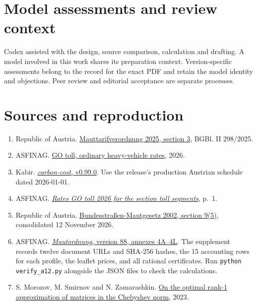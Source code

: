 \documentclass[11pt]{article}
\begin{document}
\section*{Model assessments and review context}
Codex assisted with the design, source comparison, calculation and drafting. A model involved in this work shares its preparation context. Version-specific assessments belong to the record for the exact PDF and retain the model identity and objections. Peer review and editorial acceptance are separate processes.

\section*{Sources and reproduction}
\begin{enumerate}
\item Republic of Austria. \href{https://ris.bka.gv.at/eli/bgbl/ii/2025/298/P3/NOR40273503}{Mauttarifverordnung 2025, section 3}, BGBl. II 298/2025.
\item ASFINAG. \href{https://go-maut.at/go-maut-bezahlen/tarife-go-maut/}{GO toll, ordinary heavy-vehicle rates}, 2026.
\item Kabir. \href{https://doi.org/10.5281/zenodo.24406888}{\textit{carbon-cost}, v0.99.0}. Use the release's production Austrian schedule dated 2026-01-01.
\item ASFINAG. \href{https://www.go-maut.at/media/zglel2dk/go-maut-tarife-2026_streckenmaut_en.pdf}{\textit{Rates GO toll 2026 for the section toll segments}}, p.~1.
\item Republic of Austria. \href{https://www.ris.bka.gv.at/GeltendeFassung.wxe?Abfrage=Bundesnormen&FassungVom=2026-11-12&Gesetzesnummer=20002090}{Bundesstra\ss en-Mautgesetz 2002, section 9(5)}, consolidated 12 November 2026.
\item ASFINAG. \href{https://www.asfinag.at/maut-vignette/mautordnung/}{\textit{Mautordnung}, version 88, annexes 4A--4L}. The supplement records twelve document URLs and SHA-256 hashes, the 15 accounting rows for each profile, the leaflet prices, and all rational certificates. Run \texttt{python verify\_a12.py} alongside the JSON files to check the calculations.
\item S. Morozov, M. Smirnov and N. Zamarashkin. \href{https://arxiv.org/abs/2212.01438}{On the optimal rank-1 approximation of matrices in the Chebyshev norm}, 2023.
\end{enumerate}
\end{document}
